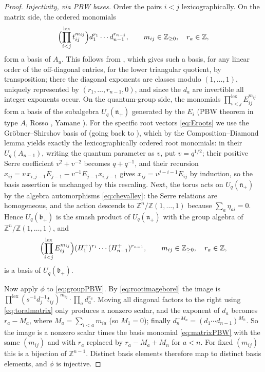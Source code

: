 \documentclass[11pt]{article}
\theoremstyle{remark}
\newcommand{\U}{U_q}
\newcommand{\bp}{\mathfrak b_+}
\newcommand{\np}{\mathfrak n_+}
\begin{document}
\begin{proof}
\emph{Injectivity, via PBW bases.} Order the pairs $i<j$
lexicographically. On the matrix side, the ordered monomials
\begin{equation}\label{eq:matrixPBW}
 \Bigl(\prod_{i<j}^{\mathrm{lex}}t_{ij}^{m_{ij}}\Bigr)
 d_1^{r_1}\cdots d_{n-1}^{r_{n-1}},
 \qquad m_{ij}\in\mathbb Z_{\ge0},\quad r_a\in\mathbb Z,
\end{equation}
form a basis of $A_u$. This follows from \cite[Proposition 3.10]{LY},
which gives such a basis, for any linear order of the off-diagonal
entries, for the lower triangular quotient, by transposition; there the
diagonal exponents are classes modulo $(1,\dots,1)$, uniquely
represented by $(r_1,\dots,r_{n-1},0)$, and since the $d_a$ are
invertible all integer exponents occur.
On the quantum-group side, the monomials
$\prod^{\mathrm{lex}}_{i<j}E_{ij}^{m_{ij}}$ form a basis of the
subalgebra $\U(\np)$ generated by the $E_i$ (PBW theorem in type $A$,
Rosso \cite{Ro}, Yamane \cite{Ya}). For the specific root vectors
\eqref{eq:Eroots} we use the Gr\"obner--Shirshov basis of
\cite[Theorem 3.1]{CSS} (going back to \cite{BM}), which by the
Composition--Diamond lemma \cite[Lemma 2.4]{CSS} yields exactly the
lexicographically ordered root monomials: in their $U_q(A_{n-1})$,
writing the quantum parameter as $v$, put $v=q^{1/2}$; their positive
Serre coefficient $v^2+v^{-2}$ becomes $q+q^{-1}$, and their recursion
$x_{ij}=v\,x_{i,j-1}E_{j-1}-v^{-1}E_{j-1}x_{i,j-1}$ gives
$x_{ij}=v^{j-i-1}E_{ij}$ by induction, so the basis assertion is
unchanged by this rescaling. Next, the torus acts on $\U(\np)$ by the
algebra automorphisms \eqref{eq:chevalley}: the Serre relations are
homogeneous, and the action descends to
$\mathbb Z^n/\mathbb Z(1,\dots,1)$ because $\sum_a\eta_{ai}=0$. Hence
$\U(\bp)$ is the smash product of $\U(\np)$ with the group algebra of
$\mathbb Z^n/\mathbb Z(1,\dots,1)$, and
\begin{equation}\label{eq:groupPBW}
 \Bigl(\prod_{i<j}^{\mathrm{lex}}E_{ij}^{m_{ij}}\Bigr)
 (H^+_1)^{r_1}\cdots(H^+_{n-1})^{r_{n-1}},
 \qquad m_{ij}\in\mathbb Z_{\ge0},\quad r_a\in\mathbb Z,
\end{equation}
is a basis of $\U(\bp)$.

Now apply $\phi$ to \eqref{eq:groupPBW}. By
\eqref{eq:rootimageborel} the image is
$\prod^{\mathrm{lex}}(s^{-1}d_j^{-1}t_{ij})^{m_{ij}}\cdot\prod_a d_a^{r_a}$.
Moving all diagonal factors to the right using \eqref{eq:toralmatrix}
only produces a nonzero scalar, and the exponent of $d_a$ becomes
$r_a-M_a$, where $M_a=\sum_{i<a}m_{ia}$ (so $M_1=0$); finally
$d_n^{-M_n}=(d_1\cdots d_{n-1})^{M_n}$. So the image is a nonzero
scalar times the basis monomial \eqref{eq:matrixPBW} with the same
$(m_{ij})$ and with $r_a$ replaced by $r_a-M_a+M_n$ for $a<n$. For
fixed $(m_{ij})$ this is a bijection of $\mathbb Z^{n-1}$. Distinct
basis elements therefore map to distinct basis elements, and $\phi$ is
injective.


\end{proof}
\end{document}
